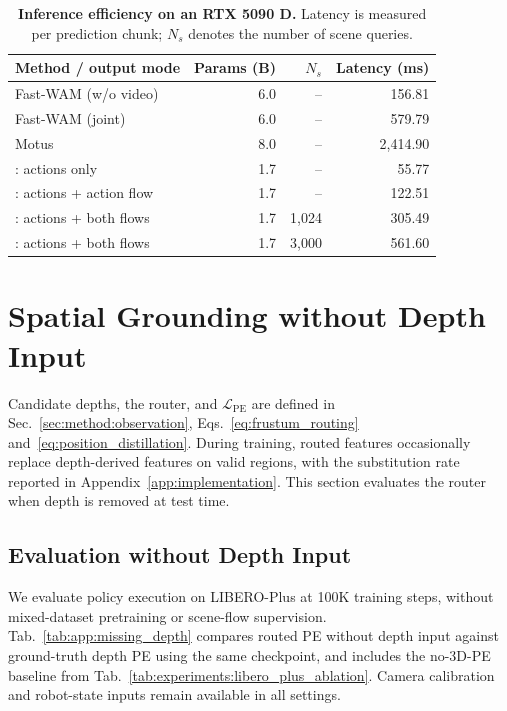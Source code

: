 \begin{table}[!htbp]
    \centering
    \small
    \setlength{\tabcolsep}{6pt}
    \renewcommand{\arraystretch}{1.08}
    \caption{\textbf{Inference efficiency on an RTX 5090 D.}
    Latency is measured per prediction chunk; $N_s$ denotes the number
    of scene queries.}
    \label{tab:app:inference_efficiency}
    \begin{tabular}{@{}lrrr@{}}
        \toprule
        Method / output mode & Params (B) & $N_s$ & Latency (ms) \\
        \midrule
        Fast-WAM (w/o video) & 6.0 & -- & 156.81 \\
        Fast-WAM (joint) & 6.0 & -- & 579.79 \\
        Motus & 8.0 & -- & 2,414.90 \\
        \midrule
        \method{}: actions only & 1.7 & -- & 55.77 \\
        \method{}: actions + action flow & 1.7 & -- & 122.51 \\
        \method{}: actions + both flows & 1.7 & 1,024 & 305.49 \\
        \method{}: actions + both flows & 1.7 & 3,000 & 561.60 \\
        \bottomrule
    \end{tabular}
\end{table}



\section{Spatial Grounding without Depth Input}
\label{app:missing_depth}

Candidate depths, the router, and $\mathcal L_{\mathrm{PE}}$ are defined
in Sec.~\ref{sec:method:observation},
Eqs.~\eqref{eq:frustum_routing} and~\eqref{eq:position_distillation}.
During training, routed features occasionally replace depth-derived
features on valid regions, with the substitution rate reported in
Appendix~\ref{app:implementation}.
This section evaluates the router when depth is removed at test time.

\subsection{Evaluation without Depth Input}
\label{app:missing_depth:evaluation}

We evaluate policy execution on LIBERO-Plus at 100K training steps,
without mixed-dataset pretraining or scene-flow supervision.
Tab.~\ref{tab:app:missing_depth} compares routed PE without depth input
against ground-truth depth PE using the same checkpoint, and includes
the no-3D-PE baseline from Tab.~\ref{tab:experiments:libero_plus_ablation}.
Camera calibration and robot-state inputs remain available in all settings.

